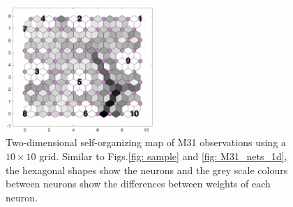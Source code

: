 \begin{figure}
        \centering
        \includegraphics[width=0.5\textwidth]{../../images0.01/M31/2D/diff_dimension/combine_2D_data_between_cols3and26.png}
    \caption{Two-dimensional self-organizing map of M31 observations using a $10\times10$ grid. Similar to Figs.\ref{fig: sample} and \ref{fig: M31_nets_1d}, the hexagonal shapes show the neurons and the grey scale colours between neurons show the differences between weights of each neuron.}
    \label{fig: all_derived_ones}
\end{figure}
